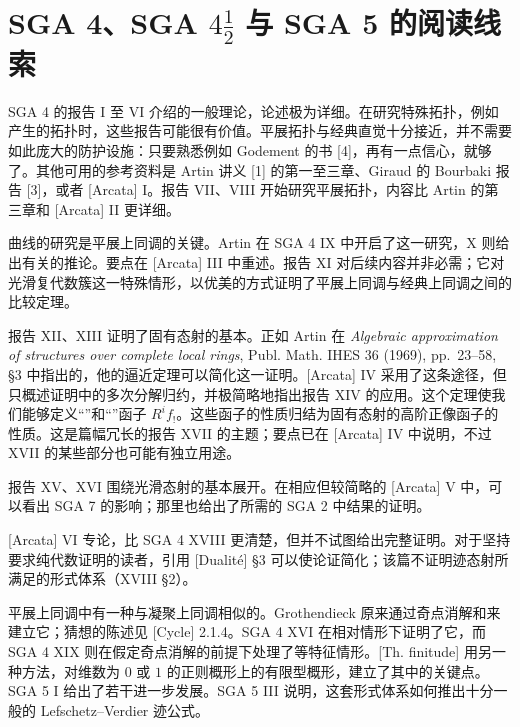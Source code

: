 \chapter*{SGA 4、SGA $4\frac12$ 与 SGA 5 的阅读线索}
SGA 4 的报告 I 至 VI 介绍的一般理论，论述极为详细。在研究特殊拓扑，例如产生的拓扑时，这些报告可能很有价值。平展拓扑与经典直觉十分接近，并不需要如此庞大的防护设施：只要熟悉例如 Godement 的书 [4]，再有一点信心，就够了。其他可用的参考资料是 Artin 讲义 [1] 的第一至三章、Giraud 的 Bourbaki 报告 [3]，或者 [Arcata] I。报告 VII、VIII 开始研究平展拓扑，内容比 Artin 的第三章和 [Arcata] II 更详细。

曲线的研究是平展上同调的关键。Artin 在 SGA 4 IX 中开启了这一研究，X 则给出有关的推论。要点在 [Arcata] III 中重述。报告 XI 对后续内容并非必需；它对光滑复代数簇这一特殊情形，以优美的方式证明了平展上同调与经典上同调之间的比较定理。

报告 XII、XIII 证明了固有态射的基本。正如 Artin 在 \textit{Algebraic approximation of structures over complete local rings}, Publ. Math. IHES 36 (1969), pp.~23--58, §3 中指出的，他的逼近定理可以简化这一证明。[Arcata] IV 采用了这条途径，但只概述证明中的多次分解归约，并极简略地指出报告 XIV 的应用。这个定理使我们能够定义“”和“”函子 $R^if_!$。这些函子的性质归结为固有态射的高阶正像函子的性质。这是篇幅冗长的报告 XVII 的主题；要点已在 [Arcata] IV 中说明，不过 XVII 的某些部分也可能有独立用途。

报告 XV、XVI 围绕光滑态射的基本展开。在相应但较简略的 [Arcata] V 中，可以看出 SGA 7 的影响；那里也给出了所需的 SGA 2 中结果的证明。

[Arcata] VI 专论，比 SGA 4 XVIII 更清楚，但并不试图给出完整证明。对于坚持要求纯代数证明的读者，引用 [Dualité] §3 可以使论证简化；该篇不证明迹态射所满足的形式体系（XVIII §2）。

平展上同调中有一种与凝聚上同调相似的。Grothendieck 原来通过奇点消解和来建立它；猜想的陈述见 [Cycle] 2.1.4。SGA 4 XVI 在相对情形下证明了它，而 SGA 4 XIX 则在假定奇点消解的前提下处理了等特征情形。[Th. finitude] 用另一种方法，对维数为 $0$ 或 $1$ 的正则概形上的有限型概形，建立了其中的关键点。SGA 5 I 给出了若干进一步发展。SGA 5 III 说明，这套形式体系如何推出十分一般的 Lefschetz--Verdier 迹公式。

